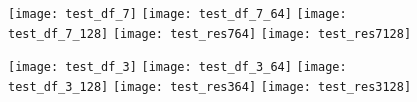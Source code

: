 \begin{figure}[H]
  \texttt{[image: test\_df\_7]}
\endminipage\hfill
{}
  \texttt{[image: test\_df\_7\_64]}
\endminipage\hfill
{}
  \texttt{[image: test\_df\_7\_128]}
\endminipage\hfill
{}
  \texttt{[image: test\_res764]}
\endminipage\hfill
{}
  \texttt{[image: test\_res7128]}
\endminipage\hfill
\end{figure}

\begin{figure}[H]
  \texttt{[image: test\_df\_3]}
\endminipage\hfill
{}
  \texttt{[image: test\_df\_3\_64]}
\endminipage\hfill
{}
  \texttt{[image: test\_df\_3\_128]}
\endminipage\hfill
{}
  \texttt{[image: test\_res364]}
\endminipage\hfill
{}
  \texttt{[image: test\_res3128]}
\endminipage\hfill
\end{figure}
